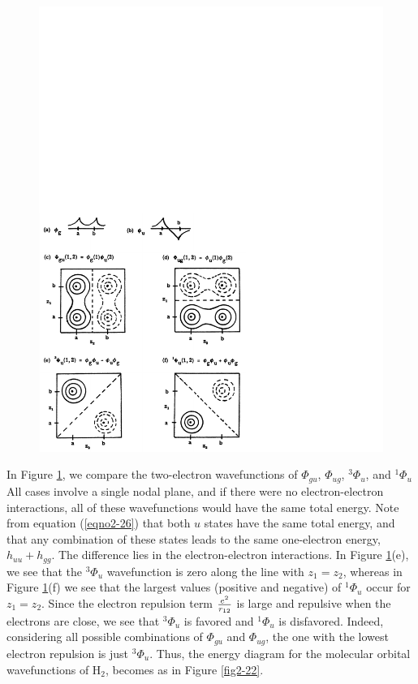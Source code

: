 \begin{figure}
\includegraphics[scale=0.75]{fig2-21}
\caption{}
\label{fig2-21}
\end{figure}

In Figure \ref{fig2-21}, we compare the two-electron wavefunctions of
$\Phi_{gu}$, $\Phi_{ug}$, $^3\Phi_u$, and $^1\Phi_u$ All cases involve
a single nodal plane, and if there were no electron-electron
interactions, all of these wavefunctions would have the same total
energy. Note from equation (\ref{eqno2-26}) that both $u$ states have
the same total energy, and that any combination of these states leads
to the same one-electron energy, $h_{uu} + h_{gg}$. The difference
lies in the electron-electron interactions.  In Figure
\ref{fig2-21}(e), we see that the $^3\Phi_u$ wavefunction is zero
along the line with $z_1 = z_2$, whereas in Figure \ref{fig2-21}(f) we
see that the largest values (positive and negative) of $^1\Phi_u$
occur for $z_1 = z_2$. Since the electron repulsion term ${e^2 \over
r_{12}}$ is large and repulsive when the electrons are close, we see
that $^3\Phi_u$ is favored and $^1\Phi_u$ is disfavored. Indeed,
considering all possible combinations of $\Phi_{gu}$ and $\Phi_{ug}$,
the one with the lowest electron repulsion is just $^3\Phi_u$.  Thus,
the energy diagram for the molecular orbital wavefunctions of H$_2$,
becomes as in Figure \ref{fig2-22}.

